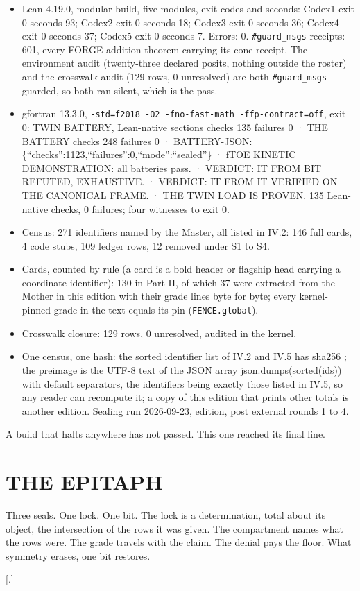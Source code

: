 \documentclass[10pt,twocolumn]{article}
\providecommand{\tightlist}{\setlength{\itemsep}{0pt}\setlength{\parskip}{0pt}}
\begin{document}
\begin{itemize}
\tightlist
\item
  Lean 4.19.0, modular build, five modules, exit codes and seconds:
  Codex1 exit 0 seconds 93; Codex2 exit 0 seconds 18; Codex3 exit 0
  seconds 36; Codex4 exit 0 seconds 37; Codex5 exit 0 seconds 7. Errors:
  0. \texttt{\#guard\_msgs} receipts: 601, every FORGE-addition theorem
  carrying its cone receipt. The environment audit (twenty-three
  declared posits, nothing outside the roster) and the crosswalk audit
  (129 rows, 0 unresolved) are both \texttt{\#guard\_msgs}-guarded, so
  both ran silent, which is the pass.
\item
  gfortran 13.3.0,
  \texttt{-std=f2018\ -O2\ -fno-fast-math\ -ffp-contract=off}, exit 0:
  TWIN BATTERY, Lean-native sections checks 135 failures 0 · THE BATTERY
  checks 248 failures 0 · BATTERY-JSON:
  \{``checks'':1123,``failures'':0,``mode'':``sealed''\} · fTOE KINETIC
  DEMONSTRATION: all batteries pass. · VERDICT: IT FROM BIT REFUTED,
  EXHAUSTIVE. · VERDICT: IT FROM IT VERIFIED ON THE CANONICAL FRAME. ·
  THE TWIN LOAD IS PROVEN. 135 Lean-native checks, 0 failures; four
  witnesses to exit 0.
\item
  Census: 271 identifiers named by the Master, all listed in IV.2: 146
  full cards, 4 code stubs, 109 ledger rows, 12 removed under S1 to S4.
\item
  Cards, counted by rule (a card is a bold header or flagship head
  carrying a coordinate identifier): 130 in Part II, of which 37 were
  extracted from the Mother in this edition with their grade lines byte
  for byte; every kernel-pinned grade in the text equals its pin
  (\texttt{FENCE.global}).
\item
  Crosswalk closure: 129 rows, 0 unresolved, audited in the kernel.
\item
  One census, one hash: the sorted identifier list of IV.2 and IV.5 has
  sha256
  \texttt{};
  the preimage is the UTF-8 text of the JSON array
  json.dumps(sorted(ids)) with default separators, the identifiers being
  exactly those listed in IV.5, so any reader can recompute it; a copy
  of this edition that prints other totals is another edition. Sealing
  run 2026-09-23, edition, post external rounds 1 to 4.
\end{itemize}

A build that halts anywhere has not passed. This one reached its final
line.

\hypertarget{the-epitaph}{%
\section{THE EPITAPH}\label{the-epitaph}}

Three seals. One lock. One bit. The lock is a determination, total about
its object, the intersection of the rows it was given. The compartment
names what the rows were. The grade travels with the claim. The denial
pays the floor. What symmetry erases, one bit restores.

{[}.{]}
\end{document}
